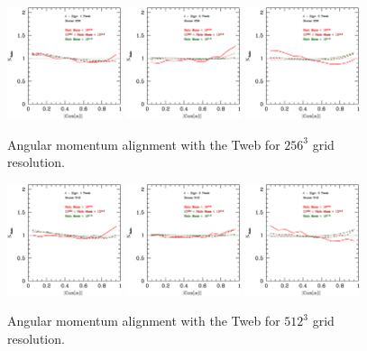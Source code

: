 \documentclass[usenatbib]{mn2e}
\begin{document}
\begin{figure}
\includegraphics[width=0.30\textwidth]{../plot2/J/256_J_T1.ps}
\includegraphics[width=0.30\textwidth]{../plot2/J/256_J_T2.ps}
\includegraphics[width=0.30\textwidth]{../plot2/J/256_J_T3.ps}
\caption{Angular momentum alignment with the Tweb for $256^3$ grid resolution.}
\end{figure}


\begin{figure}
\includegraphics[width=0.30\textwidth]{../plot2/J/512_J_T1.ps}
\includegraphics[width=0.30\textwidth]{../plot2/J/512_J_T2.ps}
\includegraphics[width=0.30\textwidth]{../plot2/J/512_J_T3.ps}
\caption{Angular momentum alignment with the Tweb for $512^3$ grid resolution.}
\end{figure}
\end{document}
